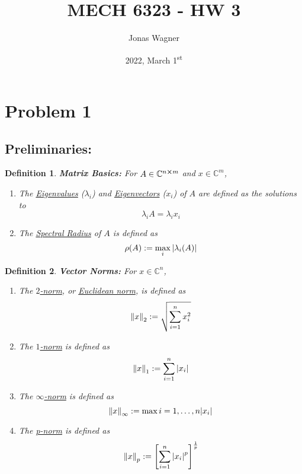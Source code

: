 \documentclass[letter]{article}
\title{MECH 6323 - HW 3}
\author{Jonas Wagner}
\date{2022, March 1\textsuperscript{st}}
\numberwithin{equation}{section}
\newcommand{\C}{\mathbb{C}}
\newtheorem{definition}{Definition}
\begin{document}
	

\maketitle

\tableofcontents

\newpage
\section{Problem 1}
\subsection*{Preliminaries:}
\begin{definition}
    \textbf{Matrix Basics:} 
    For $A \in \C^{n \cross m}$ and $x \in \C^{m}$,
    \begin{enumerate}
        \item The \emph{\underline{Eigenvalues}} ($\lambda_i$) and \emph{\underline{Eigenvectors}} ($x_i$) of $A$ are defined as the solutions to \[
            \lambda_i A = \lambda_i x_i
        \] \item The \emph{\underline{Spectral Radius}} of $A$ is defined as \[
            \rho(A) := \max_{i} \abs{\lambda_i(A)}
        \]
    \end{enumerate}
\end{definition}

\begin{definition}
    \textbf{Vector Norms:} 
    For $x \in \C^{n}$,
    \begin{enumerate}
        \item The \emph{\underline{$2$-norm}}, or \emph{\underline{Euclidean norm}}, is defined as\[
            \norm{x}_2 := \sqrt{\sum_{i=1}^{n} x_{i}^{2}}
        \] \item The \emph{\underline{$1$-norm}} is defined as\[
            \norm{x}_1 := \sum_{i=1}^{n} \abs{x_{i}}
        \] \item The \emph{\underline{$\infty$-norm}} is defined as\[
            \norm{x}_\infty := \max{i = 1,\dots,n} \abs{x_{i}}
        \] \item The \emph{\underline{p-norm}} is defined as\[
            \norm{x}_p := \qty[\sum_{i=1}^{n} \abs{x_{i}}^{p}]^{\frac{1}{p}}
        \]
    \end{enumerate}
\end{definition}
\end{document}
